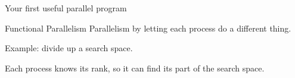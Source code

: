  {Your first useful parallel program}

\begin{numberedframe}{Functional Parallelism}
  Parallelism by letting each process do a different thing.

  Example: divide up a search space.

  Each process knows its rank, so it can find its part of the search space.
\end{numberedframe}

\begin{exerciseframe}[prime]
  
\end{exerciseframe}

\begin{exerciseframe}
  
\end{exerciseframe}

\endinput

\begin{numberedframe}\frametitle{}
\begin{lstlisting}
\end{lstlisting}
\end{numberedframe}

